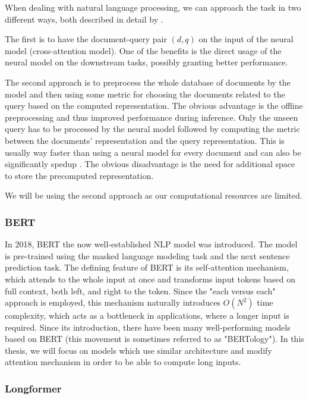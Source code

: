 When dealing with natural language processing, we can approach the task in two different ways, both described in detail by \cite{two-tower}. 

The first is to have the document-query pair $(d,q)$ on the input of the neural model (cross-attention model).
One of the benefits is the direct usage of the neural model on the downstream tasks, possibly granting better performance.

The second approach is to preprocess the whole database of documents by the model and then using some metric for choosing the documents related to the query based on the computed representation.
The obvious advantage is the offline preprocessing and thus improved performance during inference.
Only the unseen query has to be processed by the neural model followed by computing the metric between the documents' representation and the query representation.
This is usually way faster than using a neural model for every document and can also be significantly spedup \citep{faiss}.
The obvious disadvantage is the need for additional space to store the precomputed representation.

We will be using the second approach as our computational resources are limited.

\subsubsection{BERT}
In 2018, BERT \citep{bert} the now well-established NLP model was introduced. The model is pre-trained using the masked language modeling task and the next sentence prediction task.
The defining feature of BERT is its self-attention mechanism, which attends to the whole input at once and transforms input tokens based on full context, both left, and right to the token.
Since the "each versus each" approach is employed, this mechanism naturally introduces $O(N^2)$ time complexity, which acts as a bottleneck in applications, where a longer input is required.
Since its introduction, there have been many well-performing models based on BERT (this movement is sometimes referred to as "BERTology").
In this thesis, we will focus on models which use similar architecture and modify attention mechanism in order to be able to compute long inputs.

\subsubsection{Longformer}

